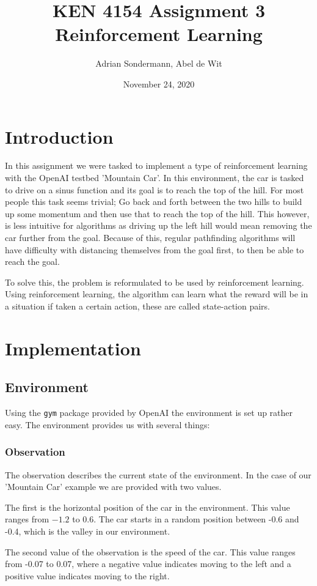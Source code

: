 \documentclass{article}
\title{\Large KEN 4154 Assignment 3 \\ \normalsize Reinforcement Learning}
\author{Adrian Sondermann, Abel de Wit}
\date{November 24, 2020}
\begin{document}
\maketitle

\section{Introduction}
In this assignment we were tasked to implement a type of reinforcement learning with the OpenAI testbed 'Mountain Car'. In this environment, the car is tasked to drive on a sinus function and its goal is to reach the top of the hill. For most people this task seems trivial; Go back and forth between the two hills to build up some momentum and then use that to reach the top of the hill. This however, is less intuitive for algorithms as driving up the left hill would mean removing the car further from the goal. Because of this, regular pathfinding algorithms will have difficulty with distancing themselves from the goal first, to then be able to reach the goal. 

To solve this, the problem is reformulated to be used by reinforcement learning. Using reinforcement learning, the algorithm can learn what the reward will be in a situation if taken a certain action, these are called state-action pairs. 

\section{Implementation}
\subsection{Environment}
Using the \texttt{gym} package provided by OpenAI the environment is set up rather easy. 
The environment provides us with several things:
\subsubsection{Observation}
The observation describes the current state of the environment. 
In the case of our 'Mountain Car' example we are provided with two values. 

The first is the horizontal position of the car in the environment. This value ranges from $-1.2$ to $0.6$. The car starts in a random position between -0.6 and -0.4, which is the valley in our environment. 

The second value of the observation is the speed of the car. This value ranges from -0.07 to 0.07, where a negative value indicates moving to the left and a positive value indicates moving to the right.
\end{document}

